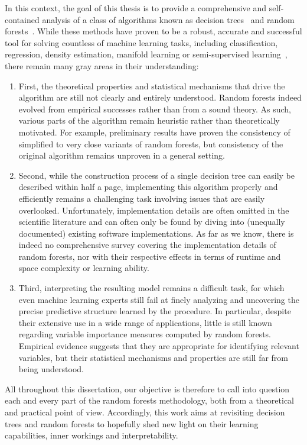In this context, the goal of this thesis is to provide a comprehensive and
self-contained analysis of a class of algorithms known as decision
trees~\citep{breiman:1984} and random forests~\citep{breiman:2001}. While these
methods have proven to be a robust, accurate and successful tool for solving
countless of machine learning tasks, including classification, regression,
density estimation, manifold learning or semi-supervised
learning~\citep{criminisi:2013}, there remain many gray areas in their
understanding:
\begin{enumerate}
\item First, the theoretical properties and statistical mechanisms that drive
the algorithm are still not clearly and entirely understood. Random forests
indeed evolved from empirical successes rather than from a sound
theory. As such, various parts of the algorithm remain heuristic rather than
theoretically motivated. For example, preliminary
results have proven the consistency of simplified to very close variants of
random forests, but consistency of the original algorithm remains unproven
in a general setting.
\item Second, while the construction process of a single decision tree can
easily be described within half a page, implementing this algorithm properly
and efficiently remains a challenging task involving issues that are easily
overlooked. Unfortunately, implementation details are often omitted in the
scientific literature and can often only be found by diving into
(unequally documented) existing software implementations. As far as we know,
there is indeed no comprehensive survey covering the implementation details of
random forests, nor with their respective effects in terms of runtime and space
complexity or learning ability.
\item Third, interpreting the resulting model remains a difficult task,
for which even machine learning experts still fail at finely analyzing and
uncovering the precise predictive structure learned by the procedure.
In particular, despite their extensive use in a wide range of applications, little
is still known regarding variable importance measures computed by random forests.
Empirical evidence suggests that they are appropriate for identifying
relevant variables, but their statistical mechanisms and properties are
still far from being understood.
\end{enumerate}
All throughout this dissertation, our objective is therefore to call into
question each and every part of the random forests methodology,  both from a
theoretical and practical point of view. Accordingly, this work aims at
revisiting decision trees and random forests to hopefully shed new light on
their learning capabilities, inner workings and interpretability.

